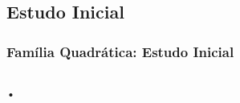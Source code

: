 \subsection{Estudo Inicial}

\begin{frame}
\vspace{5pt}
\frametitle{Família Quadrática: Estudo Inicial}
\begin{columns}
\column{\dimexpr\paperwidth-15pt}

•

\end{columns}
\end{frame}

